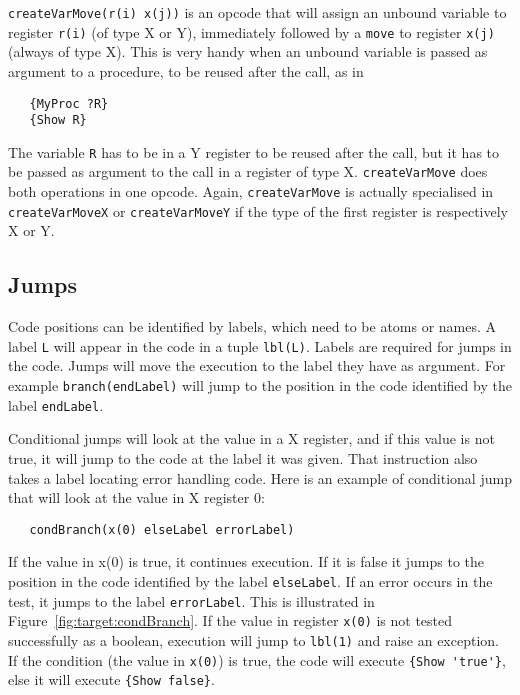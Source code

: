 \documentclass[a4paper]{memoir}
\begin{document}
\lstinline!createVarMove(r(i) x(j))! is an opcode that will assign an unbound variable to
register \lstinline!r(i)! (of type X or Y), immediately followed by a
\lstinline!move! to register \lstinline!x(j)! (always of type X). This is very
handy when an unbound variable is passed as argument to a procedure, to be
reused after the call, as in

\begin{lstlisting}
   {MyProc ?R}
   {Show R}
\end{lstlisting}

The variable \lstinline!R! has to be in a Y register to be reused after the
call, but it has to be passed as argument to the call in a register of type X.
\lstinline!createVarMove! does both operations in one opcode.
Again, \lstinline!createVarMove! is actually specialised in
\lstinline!createVarMoveX! or \lstinline!createVarMoveY! if the type of the
first register is respectively X or Y.


\subsection{Jumps}\label{sec:opcode:jumps}
Code positions can be identified by labels, which need to be atoms or names. A label \lstinline!L! will appear in the code in a tuple \lstinline!lbl(L)!. 
Labels are required for jumps in the code. 
Jumps will move the execution to the label they have as argument. For example \lstinline!branch(endLabel)! will jump to the position in the code identified by the label \lstinline!endLabel!.

Conditional jumps will look at the value in a X register, and if this value is
not true, it will jump to the code at the label it was given. That instruction
also takes a label locating error handling code. Here is an example of
conditional jump that will look at the value in X register 0:
\begin{lstlisting}
   condBranch(x(0) elseLabel errorLabel)
\end{lstlisting}
If the value in x(0) is
true, it continues execution. If it is false it jumps to the position in the
code identified by the label \lstinline!elseLabel!. If an error occurs in the
test, it jumps to the label \lstinline!errorLabel!. This is illustrated in Figure~\ref{fig:target:condBranch}.
If the value in register \lstinline!x(0)! is not tested successfully as a
boolean, execution will jump to \lstinline!lbl(1)! and raise an exception. If
the condition (the value in \lstinline!x(0)!) is true, the code will execute
\lstinline!{Show 'true'}!, else it will execute \lstinline!{Show false}!.
\end{document}
